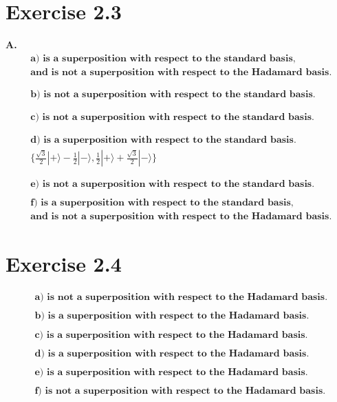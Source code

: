 \documentclass{article}
\def\ket#1{|#1\rangle}
\begin{document}
\section{Exercise 2.3 }
\textbf{A. }
\begin{align*}
    &\textbf{a) is a superposition with respect to the standard basis, } \\ &\textbf{and is not a superposition with respect to the Hadamard basis. } \\ \\ \\ 
    &\textbf{b) is not a superposition with respect to the standard basis. } \\ \\ \\ 
    &\textbf{c) is not a superposition with respect to the standard basis. } \\ \\ \\ 
    &\textbf{d) is a superposition with respect to the standard basis. } \\ 
    & \{ \frac{\sqrt{3}}{2}\ket{+} - \frac{1}{2}\ket{-}, \frac{1}{2}\ket{+} + \frac{\sqrt{3}}{2}\ket{-} \} \\ \\ \\ 
    &\textbf{e) is not a superposition with respect to the standard basis. } \\ \\ 
    & \textbf{f) is a superposition with respect to the standard basis, } \\ &\textbf{and is not a superposition with respect to the Hadamard basis. }
\end{align*}
\section{Exercise 2.4 } 
\begin{align*}
    &\textbf{a) is not a superposition with respect to the Hadamard basis. } \\ \\  
    &\textbf{b) is a superposition with respect to the Hadamard basis. } \\ \\ 
    &\textbf{c) is a superposition with respect to the Hadamard basis. } \\ \\
    &\textbf{d) is a superposition with respect to the Hadamard basis. } \\ \\
    &\textbf{e) is a superposition with respect to the Hadamard basis. } \\ \\
    &\textbf{f) is not a superposition with respect to the Hadamard basis. } \\ \\
\end{align*}
\end{document}
